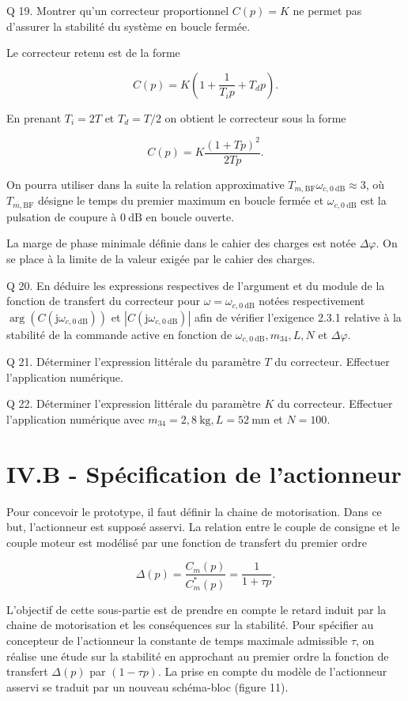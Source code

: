 \documentclass[10pt]{article}
\begin{document}
Q 19. Montrer qu'un correcteur proportionnel $C(p)=K$ ne permet pas d'assurer la stabilité du système en boucle fermée.

Le correcteur retenu est de la forme

$$
C(p)=K\left(1+\frac{1}{T_{i} p}+T_{d} p\right) .
$$

En prenant $T_{i}=2 T$ et $T_{d}=T / 2$ on obtient le correcteur sous la forme

$$
C(p)=K \frac{(1+T p)^{2}}{2 T p} .
$$

On pourra utiliser dans la suite la relation approximative $T_{m, \mathrm{BF}} \omega_{c, 0 \mathrm{~dB}} \approx 3$, où $T_{m, \mathrm{BF}}$ désigne le temps du premier maximum en boucle fermée et $\omega_{c, 0 \mathrm{~dB}}$ est la pulsation de coupure à $0 \mathrm{~dB}$ en boucle ouverte.

La marge de phase minimale définie dans le cahier des charges est notée $\Delta \varphi$. On se place à la limite de la valeur exigée par le cahier des charges.

Q 20. En déduire les expressions respectives de l'argument et du module de la fonction de transfert du correcteur pour $\omega=\omega_{c, 0 \mathrm{~dB}}$ notées respectivement $\arg \left(C\left(\mathrm{j} \omega_{c, 0 \mathrm{~dB}}\right)\right)$ et $\left|C\left(\mathrm{j} \omega_{c, 0 \mathrm{~dB}}\right)\right|$ afin de vérifier l'exigence 2.3.1 relative à la stabilité de la commande active en fonction de $\omega_{c, 0 \mathrm{~dB}}, m_{34}, L, N$ et $\Delta \varphi$.

Q 21. Déterminer l'expression littérale du paramètre $T$ du correcteur. Effectuer l'application numérique.

Q 22. Déterminer l'expression littérale du paramètre $K$ du correcteur. Effectuer l'application numérique avec $m_{34}=2,8 \mathrm{~kg}, L=52 \mathrm{~mm}$ et $N=100$.

\section{IV.B - Spécification de l'actionneur}
Pour concevoir le prototype, il faut définir la chaine de motorisation. Dans ce but, l'actionneur est supposé asservi. La relation entre le couple de consigne et le couple moteur est modélisé par une fonction de transfert du premier ordre

$$
\Delta(p)=\frac{C_{m}(p)}{C_{m}^{*}(p)}=\frac{1}{1+\tau p} .
$$

L'objectif de cette sous-partie est de prendre en compte le retard induit par la chaine de motorisation et les conséquences sur la stabilité. Pour spécifier au concepteur de l'actionneur la constante de temps maximale admissible $\tau$, on réalise une étude sur la stabilité en approchant au premier ordre la fonction de transfert $\Delta(p)$ par $(1-\tau p)$. La prise en compte du modèle de l'actionneur asservi se traduit par un nouveau schéma-bloc (figure 11).
\end{document}
